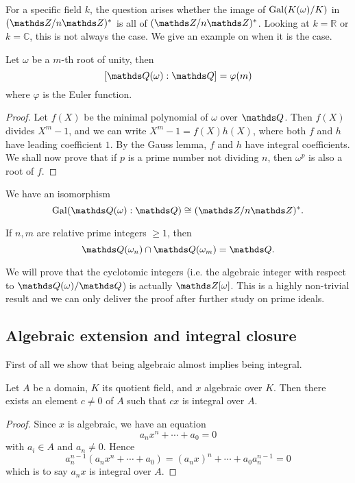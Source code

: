 				For a specific field $k$, the question arises whether the image of $\operatorname{Gal}(K(\omega)/K)$ in $(\Z/n\Z)^\ast$ is all of $(\Z/n\Z)^\ast$. Looking at $k=\mathds{R}$ or $k=\mathds{C}$, this is not always the case. We give an example on when it is the case.
				\begin{theorem}
					Let $\omega$ be a $m$-th root of unity, then
					\[
						[\Q(\omega):\Q] = \varphi(m)
					\]
					where $\varphi$ is the Euler function.
				\end{theorem}
				\begin{proof}
					Let $f(X)$ be the minimal polynomial of $\omega$ over $\Q$. Then $f(X)$ divides $X^m-1$, and we can write $X^m-1=f(X)h(X)$, where both $f$ and $h$ have leading coefficient $1$. By the Gauss lemma, $f$ and $h$ have integral coefficients. We shall now prove that if $p$ is a prime number not dividing $n$, then $\omega^p$ is also a root of $f$.
					
				\end{proof}
				\begin{corollary}
					We have an isomorphism
					\[
						\gal(\Q(\omega):\Q) \cong (\Z/n\Z)^\ast.
					\]
				\end{corollary}
			
				\begin{corollary}
					If $n,m$ are relative prime integers $\ge 1$, then
					\[
						\Q(\omega_n) \cap \Q(\omega_m) = \Q.
					\]
				\end{corollary}
			
				We will prove that the cyclotomic integers (i.e. the algebraic integer with respect to $\Q(\omega)/\Q$) is actually $\Z[\omega]$. This is a highly non-trivial result and we can only deliver the proof after further study on prime ideals.
		\subsection{Algebraic extension and integral closure}
			First of all we show that being algebraic almost implies being integral. 
			\begin{lemma}\label{alg-int}
				Let $A$ be a domain, $K$ its quotient field, and $x$ algebraic over $K$. Then there exists an element $c \ne 0$ of $A$ such that $cx$ is integral over $A$.
			\end{lemma}
			\begin{proof}
				Since $x$ is algebraic, we have an equation
				\[
					a_nx^n+\cdots+a_0=0
				\]
				with $a_i \in A$ and $a_n \ne 0$. Hence
				\[
					a_n^{n-1}(a_nx^n+\cdots+a_0)=(a_nx)^n+\cdots+a_0a_n^{n-1}=0
				\]
				which is to say $a_nx$ is integral over $A$. 
			\end{proof}
			
